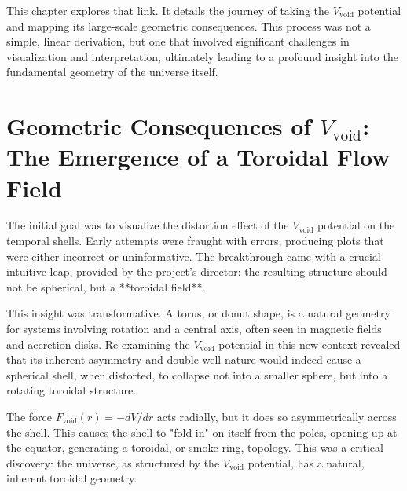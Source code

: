 \documentclass[12pt]{report}
\begin{document}
This chapter explores that link. It details the journey of taking the $V_{\text{void}}$ potential and mapping its large-scale geometric consequences. This process was not a simple, linear derivation, but one that involved significant challenges in visualization and interpretation, ultimately leading to a profound insight into the fundamental geometry of the universe itself.

\section{Geometric Consequences of \texorpdfstring{$V_{\text{void}}$}{V_void}: The Emergence of a Toroidal Flow Field}
The initial goal was to visualize the distortion effect of the $V_{\text{void}}$ potential on the temporal shells. Early attempts were fraught with errors, producing plots that were either incorrect or uninformative. The breakthrough came with a crucial intuitive leap, provided by the project's director: the resulting structure should not be spherical, but a **toroidal field**.

This insight was transformative. A torus, or donut shape, is a natural geometry for systems involving rotation and a central axis, often seen in magnetic fields and accretion disks. Re-examining the $V_{\text{void}}$ potential in this new context revealed that its inherent asymmetry and double-well nature would indeed cause a spherical shell, when distorted, to collapse not into a smaller sphere, but into a rotating toroidal structure.

The force $F_{\text{void}}(r) = -dV/dr$ acts radially, but it does so asymmetrically across the shell. This causes the shell to "fold in" on itself from the poles, opening up at the equator, generating a toroidal, or smoke-ring, topology. This was a critical discovery: the universe, as structured by the $V_{\text{void}}$ potential, has a natural, inherent toroidal geometry.
\end{document}
